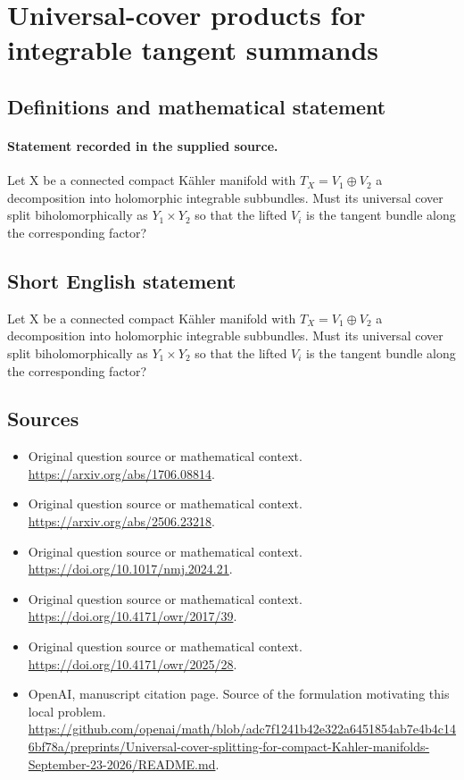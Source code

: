 \documentclass[11pt]{article}
\begin{document}
\section*{Universal-cover products for integrable tangent summands}\label{statement}
\subsection{Definitions and mathematical statement}
\paragraph{Statement recorded in the supplied source.}
Let X be a connected compact Kähler manifold with $T_X=V_{1}\oplus V_{2}$ a decomposition into holomorphic integrable subbundles. Must its universal cover split biholomorphically as $Y_{1}×Y_{2}$ so that the lifted $V_i$ is the tangent bundle along the corresponding factor?
\subsection{Short English statement}
Let X be a connected compact Kähler manifold with $T_X=V_{1}\oplus V_{2}$ a decomposition into holomorphic integrable subbundles. Must its universal cover split biholomorphically as $Y_{1}×Y_{2}$ so that the lifted $V_i$ is the tangent bundle along the corresponding factor?
\subsection{Sources}
\begin{itemize}
\item[S1] Original question source or mathematical context.
\url{https://arxiv.org/abs/1706.08814}.
\item[S2] Original question source or mathematical context.
\url{https://arxiv.org/abs/2506.23218}.
\item[S3] Original question source or mathematical context.
\url{https://doi.org/10.1017/nmj.2024.21}.
\item[S4] Original question source or mathematical context.
\url{https://doi.org/10.4171/owr/2017/39}.
\item[S5] Original question source or mathematical context.
\url{https://doi.org/10.4171/owr/2025/28}.
\item[S6] OpenAI, manuscript citation page. Source of the formulation motivating this local problem.
\url{https://github.com/openai/math/blob/adc7f1241b42e322a6451854ab7e4b4c146bf78a/preprints/Universal-cover-splitting-for-compact-Kahler-manifolds-September-23-2026/README.md}.
\end{itemize}
\end{document}
